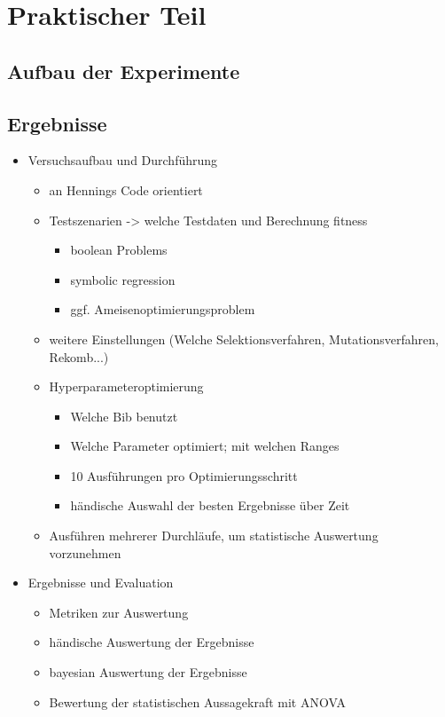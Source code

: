 \chapter{Praktischer Teil}
\label{praktischer Teil}

\section{Aufbau der Experimente}
\label{sec:aufbauExperimente}

\section{Ergebnisse}
\label{Ergebnisse}

\begin{itemize}
    \item Versuchsaufbau und Durchführung
    \begin{itemize}
        \item an Hennings Code orientiert
        \item Testszenarien -> welche Testdaten und Berechnung fitness
        \begin{itemize}
            \item boolean Problems
            \item symbolic regression
            \item ggf. Ameisenoptimierungsproblem
        \end{itemize}
        \item weitere Einstellungen (Welche Selektionsverfahren, Mutationsverfahren, Rekomb...)
        \item Hyperparameteroptimierung
        \begin{itemize}
            \item Welche Bib benutzt
            \item Welche Parameter optimiert; mit welchen Ranges
            \item 10 Ausführungen pro Optimierungsschritt
            \item händische Auswahl der besten Ergebnisse über Zeit
        \end{itemize}
        \item Ausführen mehrerer Durchläufe, um statistische Auswertung vorzunehmen
    \end{itemize}
    \item Ergebnisse und Evaluation
    \begin{itemize}
        \item Metriken zur Auswertung
        \item händische Auswertung der Ergebnisse
        \item bayesian Auswertung der Ergebnisse
        \item Bewertung der statistischen Aussagekraft mit ANOVA
    \end{itemize}
\end{itemize}